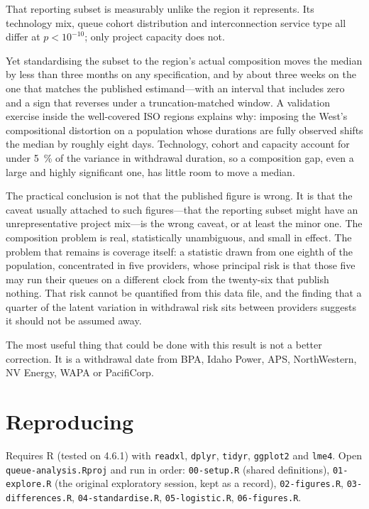 \documentclass[11pt,a4paper]{article}
\begin{document}
That reporting subset is measurably unlike the region it represents. Its
technology mix, queue cohort distribution and interconnection service type all
differ at $p < 10^{-10}$; only project capacity does not.

Yet standardising the subset to the region's actual composition moves the median
by less than three months on any specification, and by about three weeks on the
one that matches the published estimand---with an interval that includes zero and
a sign that reverses under a truncation-matched window. A validation exercise
inside the well-covered ISO regions explains why: imposing the West's
compositional distortion on a population whose durations are fully observed
shifts the median by roughly eight days. Technology, cohort and capacity account
for under \SI{5}{\percent} of the variance in withdrawal duration, so a
composition gap, even a large and highly significant one, has little room to move
a median.

The practical conclusion is not that the published figure is wrong. It is that
the caveat usually attached to such figures---that the reporting subset might
have an unrepresentative project mix---is the wrong caveat, or at least the minor
one. The composition problem is real, statistically unambiguous, and small in
effect. The problem that remains is coverage itself: a statistic drawn from one
eighth of the population, concentrated in five providers, whose principal risk is
that those five may run their queues on a different clock from the twenty-six
that publish nothing. That risk cannot be quantified from this data file, and the
finding that a quarter of the latent variation in withdrawal risk sits between
providers suggests it should not be assumed away.

The most useful thing that could be done with this result is not a better
correction. It is a withdrawal date from BPA, Idaho Power, APS, NorthWestern, NV
Energy, WAPA or PacifiCorp.

\section*{Reproducing}

Requires R (tested on 4.6.1) with \texttt{readxl}, \texttt{dplyr},
\texttt{tidyr}, \texttt{ggplot2} and \texttt{lme4}. Open
\texttt{queue-analysis.Rproj} and run in order: \texttt{00-setup.R} (shared
definitions), \texttt{01-explore.R} (the original exploratory session, kept as a
record), \texttt{02-figures.R}, \texttt{03-differences.R},
\texttt{04-standardise.R}, \texttt{05-logistic.R}, \texttt{06-figures.R}.
\end{document}
